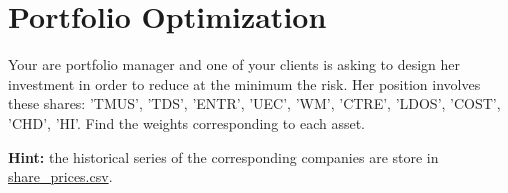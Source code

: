 \chapter{Portfolio Optimization}\label{ex-lesson-14}

\begin{Exercise}[title={(Minimum Risk Portfolio)}]
Your are portfolio manager and one of your clients is asking to design her investment in order to reduce at the minimum the risk. Her position involves these shares: 'TMUS', 'TDS', 'ENTR', 'UEC', 'WM', 'CTRE', 'LDOS', 'COST', 'CHD', 'HI'.
Find the weights corresponding to each asset.

\textbf{Hint:} the historical series of the corresponding companies are store in \href{https://drive.google.com/file/d/1ARryI7zpNVqlpzPsrNS2rTH9Knj07JBV/view?usp=sharing}{share\_prices.csv}.
\end{Exercise}
